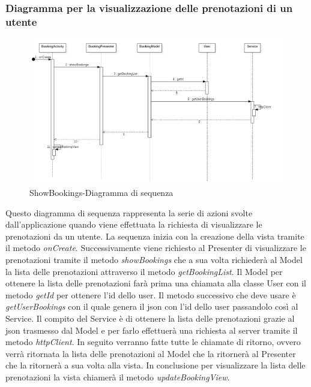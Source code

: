 \subsubsection{Diagramma per la visualizzazione delle prenotazioni di un utente}
\begin{figure}[H]
	\centering
	\includegraphics[width=16cm]{res/images/apputenti-showBookingsSeq.png}
	\caption{ShowBookings-Diagramma di sequenza}
	\label{fig:ShowBookings-Diagramma di sequenza}
\end{figure}
Questo diagramma di sequenza rappresenta la serie di azioni svolte dall'applicazione quando viene effettuata la richiesta di visualizzare le prenotazioni da un utente.
La sequenza inizia con la creazione della vista tramite il metodo \textit{onCreate}. Successivamente viene richiesto al Presenter di visualizzare le prenotazioni tramite il metodo \textit{showBookings} che a sua volta richiederà al Model la lista delle prenotazioni attraverso il metodo \textit{getBookingList}. Il Model per ottenere la lista delle prenotazioni farà prima una chiamata alla classe User con il metodo \textit{getId} per ottenere l'id dello user.
Il metodo successivo che deve usare è \textit{getUserBookings} con il quale genera il json con l'id dello user passandolo così al Service.
Il compito del Service è di ottenere la lista delle prenotazioni grazie al json trasmesso dal Model e per farlo effettuerà una richiesta al server tramite il metodo \textit{httpClient}.
In seguito verranno fatte tutte le chiamate di ritorno, ovvero verrà ritornata la lista delle prenotazioni al Model che la ritornerà al Presenter che la ritornerà a sua volta alla vista.
In conclusione per visualizzare la lista delle prenotazioni la vista chiamerà il metodo \textit{updateBookingView}. 

